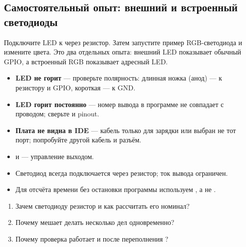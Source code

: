 \subsection{Самостоятельный опыт: внешний и встроенный светодиоды}

Подключите LED к  через резистор. Затем запустите пример RGB-светодиода и измените цвета.
Это два отдельных опыта: внешний LED показывает обычный GPIO, а встроенный RGB показывает адресный LED.

\begin{trouble}
\begin{itemize}[leftmargin=*]
  \item \textbf{LED не горит} --- проверьте полярность: длинная ножка (анод) --- к резистору и GPIO, короткая --- к GND.
  \item \textbf{LED горит постоянно} --- номер вывода в программе не совпадает с проводом; сверьте  и pinout.
  \item \textbf{Плата не видна в IDE} --- кабель только для зарядки или выбран не тот порт; попробуйте другой кабель и разъём.
\end{itemize}
\end{trouble}

\begin{summary}
\begin{itemize}[leftmargin=*]
  \item {} и  --- управление выходом.
  \item Светодиод всегда подключается через резистор; ток вывода ограничен.
  \item Для отсчёта времени без остановки программы используем , а не .
\end{itemize}
\end{summary}

\begin{selfcheck}
\begin{enumerate}
  \item Зачем светодиоду резистор и как рассчитать его номинал?
  \item Почему  мешает делать несколько дел одновременно?
  \item Почему проверка  работает и после переполнения ?
\end{enumerate}
\end{selfcheck}

